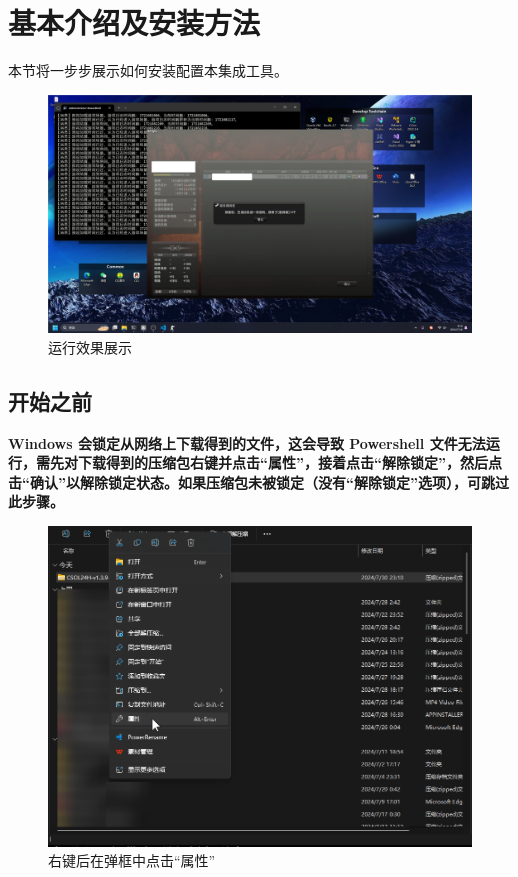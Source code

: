 \section{基本介绍及安装方法}

本节将一步步展示如何安装配置本集成工具。

\begin{figure}[H]
    \Centering
    \includegraphics[width=\textwidth]{docs/assets/controller.png}
    \caption{运行效果展示}
\end{figure}

\subsection{开始之前}

\textbf{\color{red}Windows 会锁定从网络上下载得到的文件，这会导致 Powershell 文件无法运行，需先对下载得到的压缩包右键并点击“属性”，接着点击“解除锁定”，然后点击“确认”以解除锁定状态。如果压缩包未被锁定（没有“解除锁定”选项），可跳过此步骤。}

\begin{figure}[H]
    \Centering
    \includegraphics[width=\textwidth]{docs/assets/unlock_00.png}
    \caption{右键后在弹框中点击“属性”}
\end{figure}

